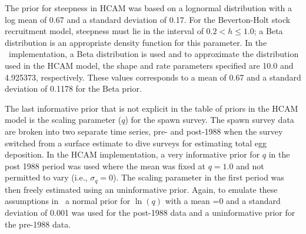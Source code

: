 The prior for steepness in  HCAM  was based on a lognormal distribution with a log mean of 0.67 and a standard deviation of 0.17.  For the Beverton-Holt stock recruitment model, steepness must lie in the interval of  $0.2<h\leq1.0$; a Beta distribution is an appropriate density function for this parameter. In the \iscam\ implementation, a Beta distribution is used and to approximate the distribution used in the HCAM model, the shape and rate parameters specified are 10.0 and 4.925373, respectively.  These values corresponds to a mean of 0.67 and a standard deviation of 0.1178 for the Beta prior.

The last informative prior that is not explicit in the table of priors in the HCAM model is the scaling parameter ($q$) for the spawn survey.  The spawn survey data are broken into two separate time series, pre- and post-1988 when the survey switched from a surface estimate to dive surveys for estimating total egg deposition.  In the HCAM implementation, a very informative prior for $q$ in the post 1988 period was used where the mean was fixed at $q=1.0$ and not permitted to vary (i.e., $\sigma_q=0$).  The scaling parameter in the first period was then freely estimated using an uninformative prior. Again, to emulate these assumptions in  \iscam\  a normal prior for $\ln(q)$ with a mean =0 and a standard deviation of 0.001 was used for the post-1988 data and a uninformative prior for the pre-1988 data.

		
%	
%	

	
	
